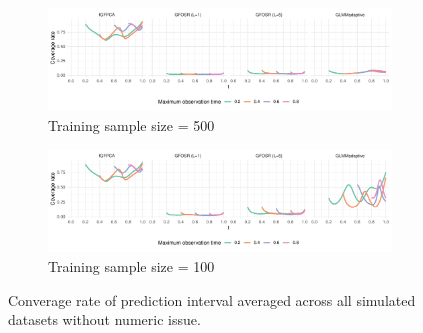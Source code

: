 \documentclass[12pt]{article}
\begin{document}
\begin{figure}
    \centering
    \begin{subfigure}{\textwidth}
    \includegraphics[width=\textwidth]{Figs/simN500_ci.pdf}
    \caption{Training sample size = 500}
    \label{fig:simN500_ci}
    \end{subfigure}

    \begin{subfigure}{\textwidth}
    \includegraphics[width=\textwidth]{Figs/simN100_ci.pdf}
    \caption{Training sample size = 100}
    \label{fig:simN100_ci}
    \end{subfigure}

    \caption{Converage rate of prediction interval averaged across all simulated datasets without numeric issue.}
    \label{fig:sim_ci}
    
\end{figure}
\end{document}
